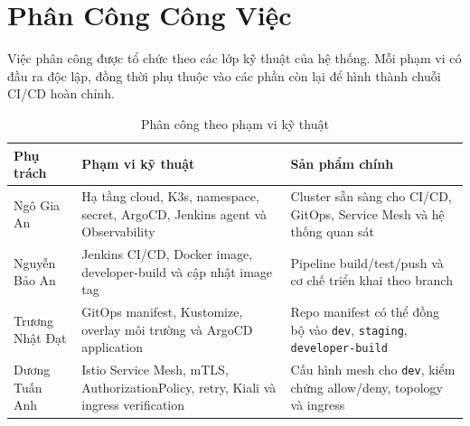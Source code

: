 \section{Phân Công Công Việc}

Việc phân công được tổ chức theo các lớp kỹ thuật của hệ thống. Mỗi phạm vi có đầu ra độc lập, đồng thời phụ thuộc vào các phần còn lại để hình thành chuỗi CI/CD hoàn chỉnh.

\begin{table}[H]
\centering
\caption{Phân công theo phạm vi kỹ thuật}
\begin{tabular}{|p{}|p{}|p{}|}
\hline
\textbf{Phụ trách} & \textbf{Phạm vi kỹ thuật} & \textbf{Sản phẩm chính} \\
\hline
Ngô Gia An & Hạ tầng cloud, K3s, namespace, secret, ArgoCD, Jenkins agent và Observability & Cluster sẵn sàng cho CI/CD, GitOps, Service Mesh và hệ thống quan sát \\
\hline
Nguyễn Bảo An & Jenkins CI/CD, Docker image, developer-build và cập nhật image tag & Pipeline build/test/push và cơ chế triển khai theo branch \\
\hline
Trương Nhật Đạt & GitOps manifest, Kustomize, overlay môi trường và ArgoCD application & Repo manifest có thể đồng bộ vào \texttt{dev}, \texttt{staging}, \texttt{developer-build} \\
\hline
Dương Tuấn Anh & Istio Service Mesh, mTLS, AuthorizationPolicy, retry, Kiali và ingress verification & Cấu hình mesh cho \texttt{dev}, kiểm chứng allow/deny, topology và ingress \\
\hline
\end{tabular}
\end{table}
